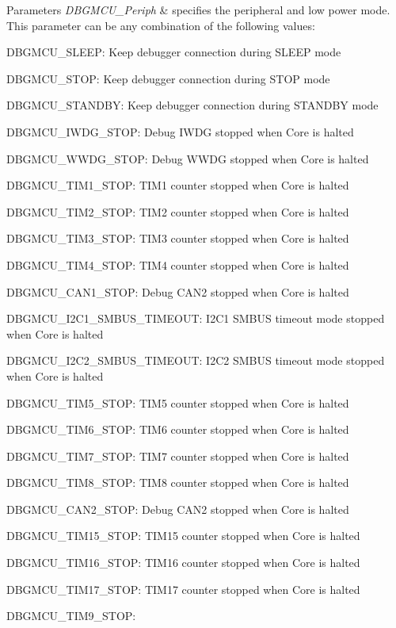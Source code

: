 \begin{DoxyParams}{Parameters}
{\em D\+B\+G\+M\+C\+U\+\_\+\+Periph} & specifies the peripheral and low power mode. This parameter can be any combination of the following values\+: \begin{DoxyItemize}
\item D\+B\+G\+M\+C\+U\+\_\+\+S\+L\+E\+EP\+: Keep debugger connection during S\+L\+E\+EP mode \item D\+B\+G\+M\+C\+U\+\_\+\+S\+T\+OP\+: Keep debugger connection during S\+T\+OP mode \item D\+B\+G\+M\+C\+U\+\_\+\+S\+T\+A\+N\+D\+BY\+: Keep debugger connection during S\+T\+A\+N\+D\+BY mode \item D\+B\+G\+M\+C\+U\+\_\+\+I\+W\+D\+G\+\_\+\+S\+T\+OP\+: Debug I\+W\+DG stopped when Core is halted \item D\+B\+G\+M\+C\+U\+\_\+\+W\+W\+D\+G\+\_\+\+S\+T\+OP\+: Debug W\+W\+DG stopped when Core is halted \item D\+B\+G\+M\+C\+U\+\_\+\+T\+I\+M1\+\_\+\+S\+T\+OP\+: T\+I\+M1 counter stopped when Core is halted \item D\+B\+G\+M\+C\+U\+\_\+\+T\+I\+M2\+\_\+\+S\+T\+OP\+: T\+I\+M2 counter stopped when Core is halted \item D\+B\+G\+M\+C\+U\+\_\+\+T\+I\+M3\+\_\+\+S\+T\+OP\+: T\+I\+M3 counter stopped when Core is halted \item D\+B\+G\+M\+C\+U\+\_\+\+T\+I\+M4\+\_\+\+S\+T\+OP\+: T\+I\+M4 counter stopped when Core is halted \item D\+B\+G\+M\+C\+U\+\_\+\+C\+A\+N1\+\_\+\+S\+T\+OP\+: Debug C\+A\+N2 stopped when Core is halted \item D\+B\+G\+M\+C\+U\+\_\+\+I2\+C1\+\_\+\+S\+M\+B\+U\+S\+\_\+\+T\+I\+M\+E\+O\+UT\+: I2\+C1 S\+M\+B\+US timeout mode stopped when Core is halted \item D\+B\+G\+M\+C\+U\+\_\+\+I2\+C2\+\_\+\+S\+M\+B\+U\+S\+\_\+\+T\+I\+M\+E\+O\+UT\+: I2\+C2 S\+M\+B\+US timeout mode stopped when Core is halted \item D\+B\+G\+M\+C\+U\+\_\+\+T\+I\+M5\+\_\+\+S\+T\+OP\+: T\+I\+M5 counter stopped when Core is halted \item D\+B\+G\+M\+C\+U\+\_\+\+T\+I\+M6\+\_\+\+S\+T\+OP\+: T\+I\+M6 counter stopped when Core is halted \item D\+B\+G\+M\+C\+U\+\_\+\+T\+I\+M7\+\_\+\+S\+T\+OP\+: T\+I\+M7 counter stopped when Core is halted \item D\+B\+G\+M\+C\+U\+\_\+\+T\+I\+M8\+\_\+\+S\+T\+OP\+: T\+I\+M8 counter stopped when Core is halted \item D\+B\+G\+M\+C\+U\+\_\+\+C\+A\+N2\+\_\+\+S\+T\+OP\+: Debug C\+A\+N2 stopped when Core is halted \item D\+B\+G\+M\+C\+U\+\_\+\+T\+I\+M15\+\_\+\+S\+T\+OP\+: T\+I\+M15 counter stopped when Core is halted \item D\+B\+G\+M\+C\+U\+\_\+\+T\+I\+M16\+\_\+\+S\+T\+OP\+: T\+I\+M16 counter stopped when Core is halted \item D\+B\+G\+M\+C\+U\+\_\+\+T\+I\+M17\+\_\+\+S\+T\+OP\+: T\+I\+M17 counter stopped when Core is halted \item D\+B\+G\+M\+C\+U\+\_\+\+T\+I\+M9\+\_\+\+S\+T\+OP\+: 
\end{DoxyItemize}
\end{DoxyParams}
